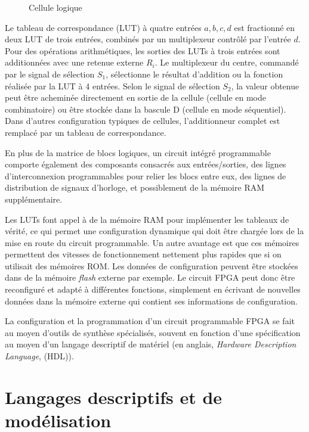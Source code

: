 \documentclass[11pt]{article}
\begin{document}
\begin{figure}[htbp]
\centering

\caption{\label{fig:org98d2a1c}Cellule logique}
\end{figure}

Le tableau de correspondance (LUT) à quatre entrées \(a, b, c, d\) est
fractionné en deux LUT de trois entrées, combinés par un multiplexeur
contrôlé par l'entrée \(d\). Pour des opérations arithmétiques, les
sorties des LUTs à trois entrées sont additionnées avec une retenue
externe \(R_i\). Le multiplexeur du centre, commandé par le signal de
sélection \(S_1\), sélectionne le résultat d'addition ou la fonction
réalisée par la LUT à 4 entrées. Selon le signal de sélection \(S_2\),
la valeur obtenue peut être acheminée directement en sortie de la
cellule (cellule en mode combinatoire) ou être stockée dans la bascule
D (cellule en mode séquentiel). Dans d'autres configuration typiques
de cellules, l'additionneur complet est remplacé par un tableau de
correspondance.

En plus de la matrice de blocs logiques, un circuit intégré
programmable comporte également des composants consacrés aux
entrées/sorties, des lignes d'interconnexion programmables pour relier
les blocs entre eux, des lignes de distribution de signaux d'horloge,
et possiblement de la mémoire RAM supplémentaire.

Les LUTs font appel à de la mémoire RAM pour implémenter les tableaux
de vérité, ce qui permet une configuration dynamique qui doit être
chargée lors de la mise en route du circuit programmable. Un autre
avantage est que ces mémoires permettent des vitesses de
fonctionnement nettement plus rapides que si on utilisait des mémoires
ROM.  Les données de configuration peuvent être stockées dans de la
mémoire \emph{flash} externe par exemple. Le circuit FPGA peut donc être
reconfiguré et adapté à différentes fonctions, simplement en écrivant
de nouvelles données dans la mémoire externe qui contient ses
informations de configuration.

La configuration et la programmation d'un circuit programmable FPGA se
fait au moyen d'outils de synthèse spécialisés, souvent en fonction
d'une spécification au moyen d'un langage descriptif de matériel (en
anglais, \emph{Hardware Description Language}, (HDL)).

\section{Langages descriptifs et de modélisation}
\label{sec:org7db6bb4}
\end{document}

